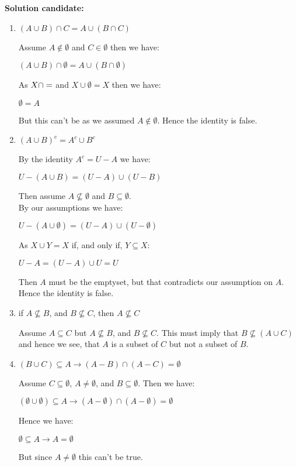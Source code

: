 \documentclass{report}
\newcommand{\cent}[1]{\begin{center}#1\end{center}}
\newcommand{\In}{\! \in \!}
\newcommand{\Solution}{\textbf{Solution candidate: }}
\begin{document}
	\Solution
	\begin{enumerate}
		\item $ (A \cup B) \cap C = A \cup (B \cap C) $
		
		Assume $A \notin \emptyset$ and $C \In \emptyset$ then we have:
		
		\cent{$ (A \cup B) \cap \emptyset = A \cup (B \cap \emptyset) $}
		
		As $X \cap \empty = \empty$ and $X \cup \emptyset = X$ then we have:
		
		\cent{$ \emptyset = A $}
		
		But this can't be as we assumed $A \notin \emptyset$. Hence the identity is false.
		
		\item $(A \cup B)^c = A^c \cup B^c$
		
		By the identity $ A^c = U-A $ we have:
		
		\cent{$U - (A \cup B) = (U-A) \cup (U-B)$}
		
		Then assume $A \not \subseteq \emptyset$ and $B \subseteq \emptyset$.\\
		
		By our assumptions we have:
		
		\cent{$ U - (A \cup \emptyset) = (U-A) \cup (U-\emptyset) $}
		
		As $X \cup Y = X$ if, and only if, $Y \subseteq X$:
		
		\cent{$ U - A = (U-A) \cup U = U $}
		
		Then $A$ must be the emptyset, but that contradicts our assumption on $A$. Hence the identity is false.
		
		\item if $ A \not \subseteq B $, and $ B \not \subseteq C $, then $ A \not \subseteq C $
		
		Assume $A \subseteq C$ but $A \not \subseteq B$, and $B \not \subseteq C$. This must imply that $B \not \subseteq (A \cup C)$ and hence we see, that $A$ is a subset of $C$ but not a subset of $B$.
		
		\item $ (B \cup C) \subseteq A \to (A-B) \cap (A-C) = \emptyset $
		
		Assume $C \subseteq \emptyset$, $A \neq \emptyset$, and $B \subseteq \emptyset$. Then we have:
		
		\cent{$ (\emptyset \cup \emptyset) \subseteq A \to (A-\emptyset) \cap (A-\emptyset) = \emptyset $}
		
		Hence we have:
		
		\cent{$ \emptyset \subseteq A \to A = \emptyset $}
		
		But since $A \neq \emptyset$ this can't be true.
		
 	\end{enumerate}
 	
\end{document}
